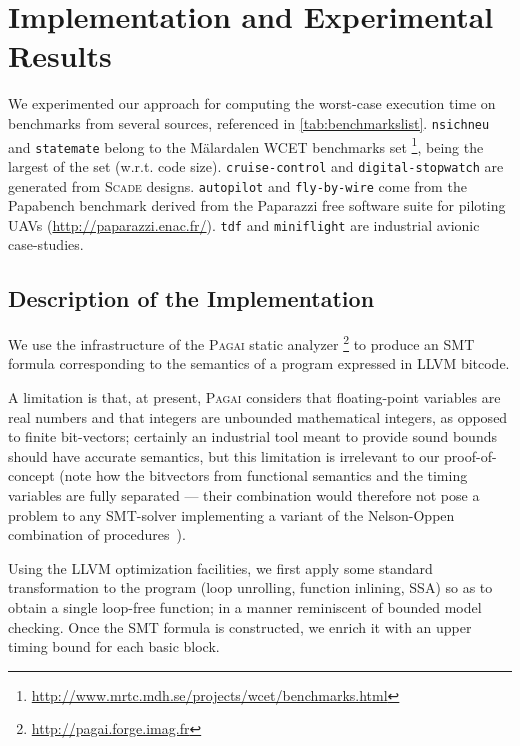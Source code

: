\documentclass[a4paper,twocolumn,11pt]{article}
\newcommand{\RegTM}{\texttrademark}
\begin{document}
\section{Implementation and Experimental Results}
\label{sec:implementation}

We experimented our approach for computing the worst-case execution time on
benchmarks from several sources, referenced in \autoref{tab:benchmarkslist}.
\texttt{nsichneu} and \texttt{statemate} belong to the M\"alardalen WCET benchmarks set 
\parencite{Gustafsson:WCET2010:Benchmarks}\footnote{\url{http://www.mrtc.mdh.se/projects/wcet/benchmarks.html}}, being the largest of the set (w.r.t. code size).
\texttt{cruise-control} and \texttt{digital-stopwatch} are generated from \textsc{Scade}{\RegTM} designs.
\texttt{autopilot} and \texttt{fly-by-wire} come from the Papabench benchmark \parencite{DBLP:conf/wcet/NemerCSBM06} derived from the Paparazzi free software suite for piloting UAVs (\url{http://paparazzi.enac.fr/}).
\texttt{tdf} and \texttt{miniflight} are industrial avionic case-studies.


\subsection{Description of the Implementation}
We use the infrastructure of the \textsc{Pagai} static analyzer 
\parencite{DBLP:journals/entcs/HenryMM12}\footnote{\url{http://pagai.forge.imag.fr}}
to produce an SMT formula
corresponding to the semantics of a program expressed in LLVM bitcode.

A limitation is that, at present, \textsc{Pagai} considers that floating-point variables are real numbers and that integers are unbounded mathematical integers, as opposed to finite bit-vectors; certainly an industrial tool meant to provide sound bounds should have accurate semantics, but this limitation is irrelevant to our proof-of-concept (note how the bitvectors from functional semantics and the timing variables are fully separated --- their combination would therefore not pose a problem to any SMT-solver implementing a variant of the Nelson-Oppen combination of procedures~\parencite[ch.~10]{Kroening_Strichman}).

Using the LLVM optimization facilities, we first apply some standard transformation to the program (loop unrolling, function inlining, SSA) so as to obtain a single loop-free function; in a manner reminiscent of bounded model checking.
Once the SMT formula is constructed, we enrich it with an upper timing bound for each basic block.
\end{document}
